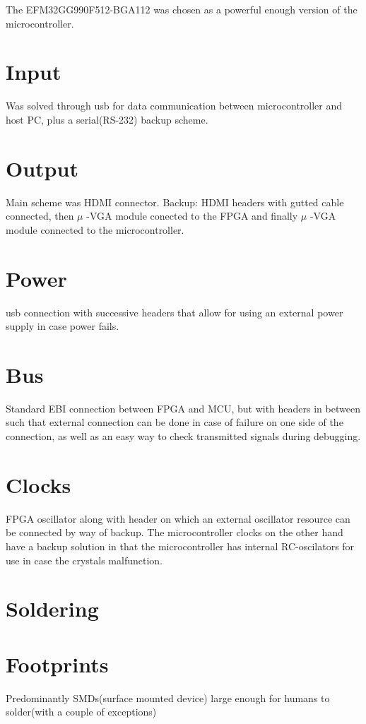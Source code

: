 The EFM32GG990F512-BGA112 was chosen as a powerful enough version of the microcontroller.

\section{Input}
Was solved through usb for data communication between microcontroller and host PC, plus a serial(RS-232) backup scheme.

\section{Output}
Main scheme was HDMI connector. Backup: HDMI headers with gutted cable connected, then $\mu$ -VGA module conected to the FPGA and finally $\mu$ -VGA module connected to the microcontroller.

\section{Power}
usb connection with successive headers that allow for using an external power supply in case power fails.

\section{Bus}
Standard EBI connection between FPGA and MCU, but with headers in between such that external connection can be done in case of failure on one side of the connection, as well as an easy way to check transmitted signals during debugging.

\section{Clocks}
FPGA oscillator along with header on which an external oscillator resource can be connected by way of backup.
The microcontroller clocks on the other hand have a backup solution in that the microcontroller has internal RC-oscilators for use in case the crystals malfunction.

\section{Soldering}



\section{Footprints}
Predominantly SMDs(surface mounted device) large enough for humans to solder(with a couple of exceptions)

